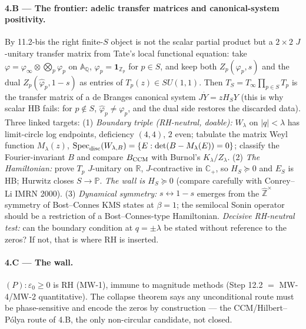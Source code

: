 \documentclass[11pt]{amsart}
\theoremstyle{definition}
\theoremstyle{remark}
\newcommand{\ve}{\varepsilon}
\begin{document}
\paragraph{4.B --- The frontier: adelic transfer matrices and canonical-system positivity.}
By 11.2-bis the right finite-$S$ object is not the scalar partial product but a $2\times2$
$J$-unitary transfer matrix from Tate's local functional equation: take $\varphi=\varphi_\infty
\otimes\bigotimes_p\varphi_p$ on $\mathbb A_{\mathbb Q}$, $\varphi_p=\mathbf 1_{\mathbb Z_p}$ for
$p\in S$, and keep both $Z_p(\varphi_p,s)$ and the dual $Z_p(\widehat\varphi_p,1-s)$ as entries of
$T_p(z)\in SU(1,1)$. Then $T_S=T_\infty\prod_{p\in S}T_p$ is the transfer matrix of a de Branges
canonical system $J\dot Y=zH_SY$ (this is why scalar HB fails: for $p\notin S$,
$\widehat\varphi_p\ne\varphi_p$, and the dual side restores the discarded data). Three linked
targets:
(1) \emph{Boundary triple (RH-neutral, doable):} $W_\lambda$ on $|q|<\lambda$ has limit-circle log
endpoints, deficiency $(4,4)$, $2$ even; tabulate the matrix Weyl function $M_\lambda(z)$,
$\operatorname{Spec}_{\rm disc}(W_{\lambda,B})=\{E:\det(B-M_\lambda(E))=0\}$; classify the
Fourier-invariant $B$ and compare $B_{\rm CCM}$ with Burnol's $K_\lambda/Z_\lambda$.
(2) \emph{The Hamiltonian:} prove $T_p$ $J$-unitary on $\mathbb R$, $J$-contractive in $\mathbb
C_+$, so $H_S\succeq0$ and $E_S$ is HB; Hurwitz closes $S\to\mathbb P$. \emph{The wall is
$H_S\succeq0$} (compare carefully with Conrey--Li IMRN 2000).
(3) \emph{Dynamical symmetry:} $s\leftrightarrow1-s$ emerges from the $\widehat{\mathbb Z}^\times$
symmetry of Bost--Connes KMS states at $\beta=1$; the semilocal Sonin operator should be a
restriction of a Bost--Connes-type Hamiltonian. \emph{Decisive RH-neutral test:} can the
boundary condition at $q=\pm\lambda$ be stated without reference to the zeros? If not, that is
where RH is inserted.
\paragraph{4.C --- The wall.} $(P):\ve_0\ge0$ is RH (MW-1), immune to magnitude methods (Step
12.2 $=$ MW-4/MW-2 quantitative). The collapse theorem says any unconditional route must be
phase-sensitive and encode the zeros by construction --- the CCM/Hilbert--P\'olya route of 4.B,
the only non-circular candidate, not closed.
\end{document}
